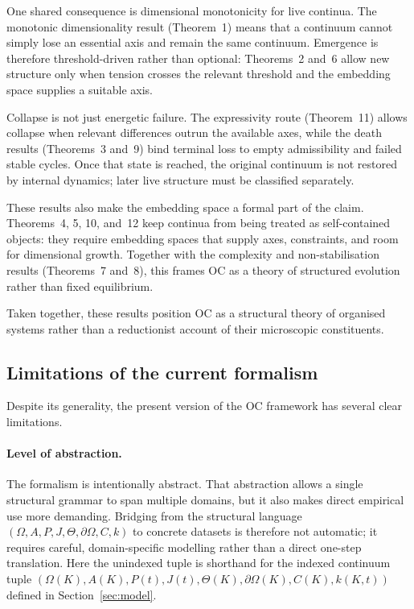One shared consequence is dimensional monotonicity for live continua. The
monotonic dimensionality result (Theorem~1) means that a
continuum cannot simply lose an essential axis and remain the same continuum.
Emergence is therefore threshold-driven rather than optional: Theorems~2 and~6
allow new structure only when tension crosses the relevant threshold and the
embedding space supplies a suitable axis.

Collapse is not just energetic failure. The
expressivity route (Theorem~11) allows collapse when relevant differences
outrun the available axes, while the death results (Theorems~3 and~9) bind
terminal loss to empty admissibility and failed stable cycles. Once that state
is reached, the original continuum is not restored by internal dynamics; later
live structure must be classified separately.

These results also make the embedding space a formal part of the
claim. Theorems~4, 5, 10, and~12 keep continua from being treated as
self-contained objects: they require embedding spaces that supply axes,
constraints, and room for dimensional growth. Together with the complexity and
non-stabilisation results (Theorems~7 and~8), this frames OC as a theory of
structured evolution rather than fixed equilibrium.

Taken together, these results position OC as a structural theory of organised systems rather than a reductionist account of their microscopic constituents.

\subsection{Limitations of the current formalism}

Despite its generality, the present version of the OC framework has several clear limitations.

\paragraph{Level of abstraction.}
The formalism is intentionally abstract. That abstraction allows a single structural grammar to span
multiple domains, but it also makes direct empirical use more demanding. Bridging from the
structural language \((\Omega,A,P,J,\Theta,\partial\Omega,C,k)\) to concrete datasets is therefore
not automatic; it requires careful, domain-specific modelling rather than a direct one-step
translation.
Here the unindexed tuple is shorthand for the indexed continuum tuple
\((\Omega(K),A(K),P(t),J(t),\Theta(K),\partial\Omega(K),C(K),k(K,t))\)
defined in Section~\ref{sec:model}.

